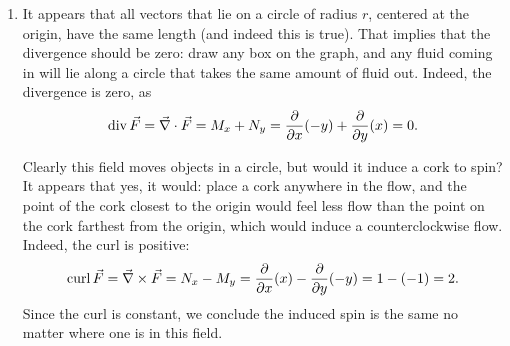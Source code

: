 \begin{example}
\begin{enumerate}
	\item
%
%
	 It appears that all vectors that lie on a circle of radius $r$, centered at the  origin, have the same length (and indeed this is true). That implies that the divergence should be zero: draw any box on the graph, and any fluid coming in will lie along a circle that takes the same amount of fluid out. Indeed, the divergence is zero, as
	\[
	\operatorname{div}\vec F = \vec\nabla \cdot \vec F
	= M_x + N_y = \frac{\partial}{\partial x}(-y) + \frac{\partial}{\partial y}(x)
	= 0.
	\]
	
		Clearly this field moves objects in a circle, but would it induce a cork to spin? It appears that yes, it would: place a cork anywhere in the flow, and the point of the cork closest to the origin would feel less flow than the point on the cork farthest from the origin, which would induce a counterclockwise flow. Indeed, the curl is positive:
	\[
	\operatorname{curl} \vec F = \vec\nabla\times\vec F = N_x-M_y
	= \frac{\partial}{\partial x}(x) - \frac{\partial}{\partial y}(-y) = 1-(-1) = 2.
	\]
	Since the curl is constant, we conclude the induced spin is the same no matter where one is in this field.
	

\end{enumerate}
\end{example}
